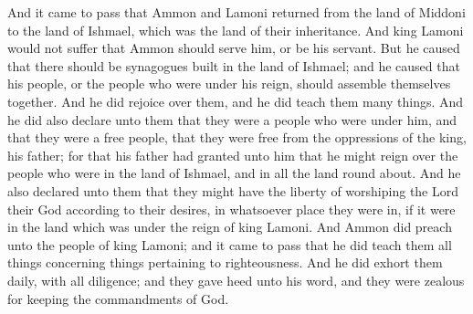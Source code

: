 And it came to pass that Ammon and Lamoni returned from the land of Middoni to the land of Ishmael, which was the land of their inheritance.
\bverse \iffalse And king Lamoni would not suffer that Ammon should serve him, or be his servant. \fi
And king Lamoni would not suffer that Ammon should serve him, or be his servant.
\bverse \iffalse But he caused that there should be synagogues built in the land of Ishmael; and he caused that his people, or the people who were under his reign, should assemble themselves together. \fi
But he caused that there should be synagogues built in the land of Ishmael; and he caused that his people, or the people who were under his reign, should assemble themselves together.
\bverse \iffalse And he did rejoice over them, and he did teach them many things. And he did also declare unto them that they were a people who were under him, and that they were a free people, that they were free from the oppressions of the king, his father; for that his father had granted unto him that he might reign over the people who were in the land of Ishmael, and in all the land round about. \fi
And he did rejoice over them, and he did teach them many things. And he did also declare unto them that they were a people who were under him, and that they were a free people, that they were free from the oppressions of the king, his father; for that his father had granted unto him that he might reign over the people who were in the land of Ishmael, and in all the land round about.
\bverse \iffalse And he also declared unto them that they might have the liberty of worshiping the Lord their God according to their desires, in whatsoever place they were in, if it were in the land which was under the reign of king Lamoni. \fi
And he also declared unto them that they might have the liberty of worshiping the Lord their God according to their desires, in whatsoever place they were in, if it were in the land which was under the reign of king Lamoni.
\bverse \iffalse And Ammon did preach unto the people of king Lamoni; and it came to pass that he did teach them all things concerning things pertaining to righteousness. And he did exhort them daily, with all diligence; and they gave heed unto his word, and they were zealous for keeping the commandments of God. \fi
And Ammon did preach unto the people of king Lamoni; and it came to pass that he did teach them all things concerning things pertaining to righteousness. And he did exhort them daily, with all diligence; and they gave heed unto his word, and they were zealous for keeping the commandments of God.
